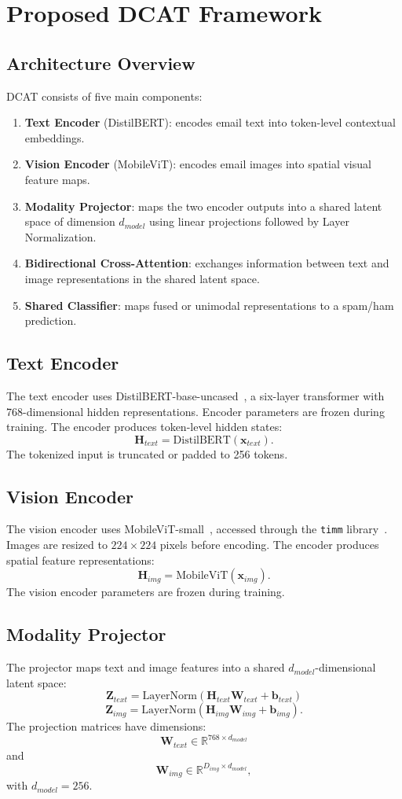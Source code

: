 \documentclass[conference]{IEEEtran}
\begin{document}
\section{Proposed DCAT Framework}
\subsection{Architecture Overview}
DCAT consists of five main components:
\begin{enumerate}
\item \textbf{Text Encoder} (DistilBERT): encodes email text into token-level contextual embeddings.
\item \textbf{Vision Encoder} (MobileViT): encodes email images into spatial visual feature maps.
\item \textbf{Modality Projector}: maps the two encoder outputs into a shared latent space of dimension $d_{model}$ using linear projections followed by Layer Normalization.
\item \textbf{Bidirectional Cross-Attention}: exchanges information between text and image representations in the shared latent space.
\item \textbf{Shared Classifier}: maps fused or unimodal representations to a spam/ham prediction.
\end{enumerate}
\subsection{Text Encoder}
The text encoder uses DistilBERT-base-uncased~\cite{ref4}, a six-layer transformer with 768-dimensional hidden representations. Encoder parameters are frozen during training.
The encoder produces token-level hidden states:
\[
\mathbf{H}_{text} = \text{DistilBERT}(\mathbf{x}_{text}).
\]
The tokenized input is truncated or padded to 256 tokens.
\subsection{Vision Encoder}
The vision encoder uses MobileViT-small~\cite{ref5}, accessed through the \texttt{timm} library~\cite{ref6}. Images are resized to $224 \times 224$ pixels before encoding.
The encoder produces spatial feature representations:
\[
\mathbf{H}_{img} = \text{MobileViT}(\mathbf{x}_{img}).
\]
The vision encoder parameters are frozen during training.
\subsection{Modality Projector}
The projector maps text and image features into a shared $d_{model}$-dimensional latent space:
\[
\mathbf{Z}_{text} = \text{LayerNorm} \left( \mathbf{H}_{text}\mathbf{W}_{text} + \mathbf{b}_{text} \right)
\]
\[
\mathbf{Z}_{img} = \text{LayerNorm} \left( \mathbf{H}_{img}\mathbf{W}_{img} + \mathbf{b}_{img} \right).
\]
The projection matrices have dimensions:
\[
\mathbf{W}_{text} \in \mathbb{R}^{768 \times d_{model}}
\]
and
\[
\mathbf{W}_{img} \in \mathbb{R}^{D_{img} \times d_{model}},
\]
with $d_{model} = 256$.
\end{document}
